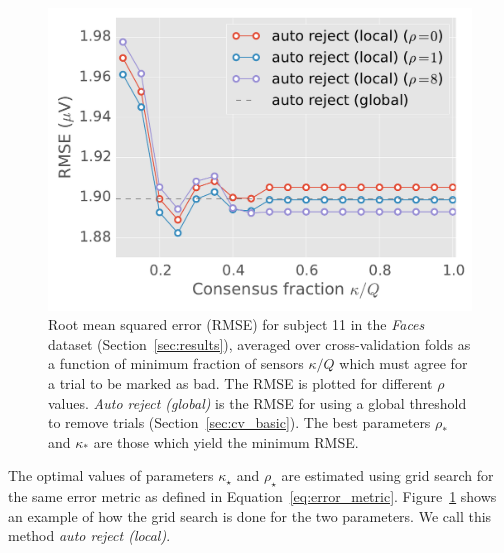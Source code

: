 \begin{figure}[t]
	\begin{center}
	\includegraphics[width=0.7\linewidth]{figures/figure3.pdf}
    \end{center}
    \caption{Root mean squared error (RMSE) for subject 11 in the \emph{Faces} dataset (Section~\ref{sec:results}), averaged over cross-validation folds as a function of minimum fraction of sensors $\kappa / Q$ which must agree for a trial to be marked as bad. The RMSE is plotted for different $\rho$ values. \emph{Auto reject (global)} is the RMSE for using a global threshold to remove trials (Section~\ref{sec:cv_basic}). The best parameters $\rho_{*}$ and $\kappa_{*}$ are those which yield the minimum RMSE.
 }
    \label{fig:fine_reject}
\end{figure}

The optimal values of parameters $\kappa_{\star}$ and $\rho_{\star}$ are estimated using grid search for the same error metric as defined in Equation~\ref{eq:error_metric}. Figure~\ref{fig:fine_reject} shows an example of how the grid search is done for the two parameters. We call this method \emph{auto reject (local)}.
